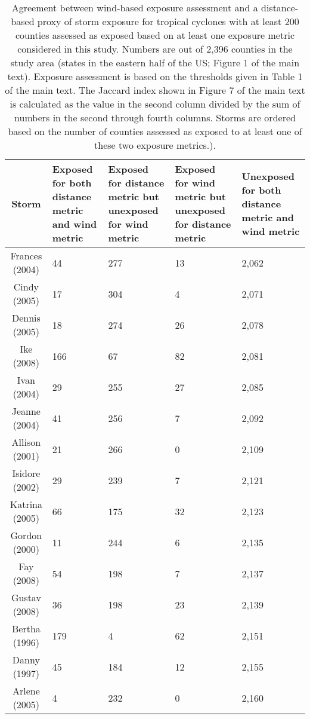 \begin{table}[ht]
\centering
\caption{Agreement between wind-based exposure assessment and a distance-based
         proxy of storm exposure for tropical cyclones with at least 200 counties assessed 
         as exposed based on at least one exposure metric considered in this study. Numbers 
         are out of 2,396 counties in the study area (states in the eastern half of the US; 
         Figure 1 of the main text). Exposure assessment is based on the thresholds given in 
         Table 1 of the main text. The Jaccard index shown in Figure 7 of the main text is 
         calculated as the value in the second column divided by the sum of numbers in the 
         second through fourth columns.  Storms are ordered based on the number of counties 
         assessed as exposed to at least one of these two exposure metrics.).} 
\label{tab:misclasswind}
\begin{tabular}{cP{3cm}P{3cm}P{3cm}P{3cm}}
  \toprule
Storm & Exposed for both distance metric and wind metric & Exposed for distance metric but unexposed for wind metric & Exposed for wind metric but unexposed for distance metric & Unexposed for both distance metric and wind metric \\ 
  \midrule
Frances (2004) & 44 & 277 & 13 & 2,062 \\ 
  Cindy (2005) & 17 & 304 & 4 & 2,071 \\ 
  Dennis (2005) & 18 & 274 & 26 & 2,078 \\ 
  Ike (2008) & 166 & 67 & 82 & 2,081 \\ 
  Ivan (2004) & 29 & 255 & 27 & 2,085 \\ 
  Jeanne (2004) & 41 & 256 & 7 & 2,092 \\ 
  Allison (2001) & 21 & 266 & 0 & 2,109 \\ 
  Isidore (2002) & 29 & 239 & 7 & 2,121 \\ 
  Katrina (2005) & 66 & 175 & 32 & 2,123 \\ 
  Gordon (2000) & 11 & 244 & 6 & 2,135 \\ 
  Fay (2008) & 54 & 198 & 7 & 2,137 \\ 
  Gustav (2008) & 36 & 198 & 23 & 2,139 \\ 
  Bertha (1996) & 179 & 4 & 62 & 2,151 \\ 
  Danny (1997) & 45 & 184 & 12 & 2,155 \\ 
  Arlene (2005) & 4 & 232 & 0 & 2,160 \\ 

\end{tabular}
\end{table}
